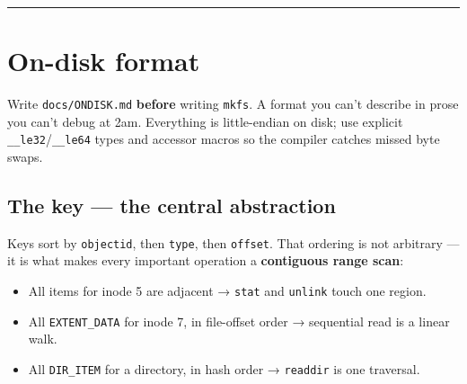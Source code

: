 
\begin{center}\rule{0.5\linewidth}{0.5pt}\end{center}

\hypertarget{on-disk-format}{%
\section{On-disk format}\label{on-disk-format}}

Write \texttt{docs/ONDISK.md} \textbf{before} writing \texttt{mkfs}. A format you can't describe in prose
you can't debug at 2am. Everything is little-endian on disk; use explicit \texttt{\_\_le32}/\texttt{\_\_le64}
types and accessor macros so the compiler catches missed byte swaps.

\hypertarget{the-key-the-central-abstraction}{%
\subsection{The key --- the central abstraction}\label{the-key-the-central-abstraction}}

\begin{Shaded}
\begin{Highlighting}[]
\OperatorTok{\{}
\OperatorTok{;}   
\OperatorTok{;}       
\OperatorTok{;}     
\OperatorTok{\}}\OperatorTok{;}
\end{Highlighting}
\end{Shaded}

Keys sort by \texttt{objectid}, then \texttt{type}, then \texttt{offset}. That ordering is not arbitrary ---
it is what makes every important operation a \textbf{contiguous range scan}:

\begin{itemize}
\tightlist
\item
  All items for inode 5 are adjacent → \texttt{stat} and \texttt{unlink} touch one region.
\item
  All \texttt{EXTENT\_DATA} for inode 7, in file-offset order → sequential read is a linear walk.
\item
  All \texttt{DIR\_ITEM} for a directory, in hash order → \texttt{readdir} is one traversal.
\end{itemize}

